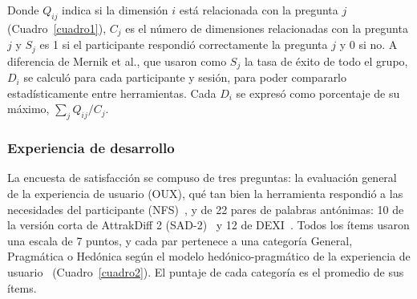 Donde $Q_{ij}$ indica si la dimensión $i$ está relacionada con la pregunta $j$ (Cuadro~\ref{cuadro1}), $C_j$ es el número de dimensiones relacionadas con la pregunta $j$ y $S_j$ es 1 si el participante respondió correctamente la pregunta $j$ y 0 si no. A diferencia de Mernik et al., que usaron como $S_j$ la tasa de éxito de todo el grupo, $D_i$ se calculó para cada participante y sesión, para poder compararlo estadísticamente entre herramientas. Cada $D_i$ se expresó como porcentaje de su máximo, $\sum_j Q_{ij} / C_j$.

\subsubsection{Experiencia de desarrollo}

La encuesta de satisfacción se compuso de tres preguntas: la evaluación general de la experiencia de usuario (OUX), qué tan bien la herramienta respondió a las necesidades del participante (NFS)~\cite{Kuusinen2016}, y de 22 pares de palabras antónimas: 10 de la versión corta de AttrakDiff 2 (SAD-2)~\cite{PDFNeedsAffect} y 12 de DEXI~\cite{Kuusinen2016}. Todos los ítems usaron una escala de 7 puntos, y cada par pertenece a una categoría General, Pragmática o Hedónica según el modelo hedónico-pragmático de la experiencia de usuario~\cite{hassenzahlPDFInterplayBeauty2026} (Cuadro~\ref{cuadro2}). El puntaje de cada categoría es el promedio de sus ítems.

